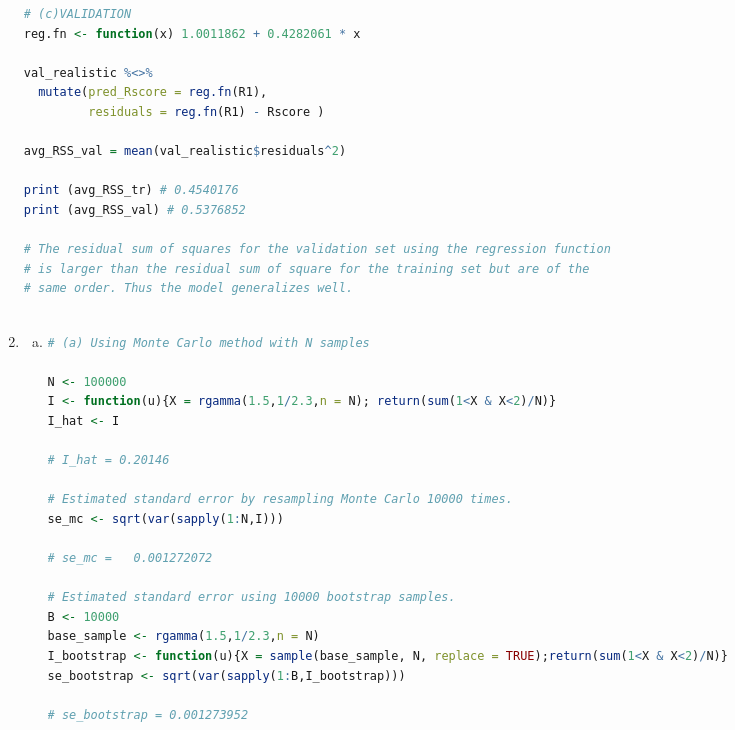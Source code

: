 \documentclass[a4paper,10pt]{article}
\theoremstyle{definition}
\begin{document}
\begin{enumerate}
\begin{lstlisting}[language=R,commentstyle=\fontseries{lc}\color{gray}]
# (c)VALIDATION
reg.fn <- function(x) 1.0011862 + 0.4282061 * x

val_realistic %<>%
  mutate(pred_Rscore = reg.fn(R1),
         residuals = reg.fn(R1) - Rscore )

avg_RSS_val = mean(val_realistic$residuals^2)

print (avg_RSS_tr) # 0.4540176
print (avg_RSS_val) # 0.5376852

# The residual sum of squares for the validation set using the regression function
# is larger than the residual sum of square for the training set but are of the
# same order. Thus the model generalizes well.



\end{lstlisting}
\newpage

\item
\begin{enumerate}[(a)]
\item 

\begin{lstlisting}[language=R,commentstyle=\fontseries{lc}\color{gray}]
# (a) Using Monte Carlo method with N samples

N <- 100000
I <- function(u){X = rgamma(1.5,1/2.3,n = N); return(sum(1<X & X<2)/N)}
I_hat <- I

# I_hat = 0.20146

# Estimated standard error by resampling Monte Carlo 10000 times.
se_mc <- sqrt(var(sapply(1:N,I)))

# se_mc =   0.001272072

# Estimated standard error using 10000 bootstrap samples.
B <- 10000
base_sample <- rgamma(1.5,1/2.3,n = N)
I_bootstrap <- function(u){X = sample(base_sample, N, replace = TRUE);return(sum(1<X & X<2)/N)}
se_bootstrap <- sqrt(var(sapply(1:B,I_bootstrap)))

# se_bootstrap = 0.001273952


\end{lstlisting}
\end{enumerate}
\end{enumerate}
\end{document}

